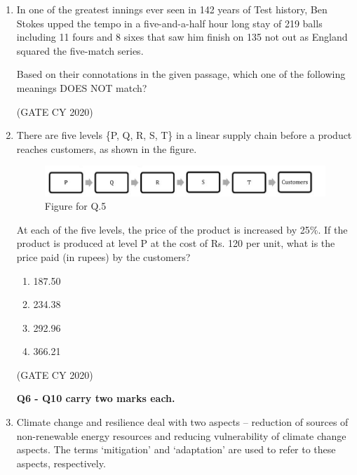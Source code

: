 \documentclass[12pt]{article}
\begin{document}
\begin{enumerate}
\item In one of the greatest innings ever seen in 142 years of Test history, Ben Stokes upped the tempo in a five-and-a-half hour long stay of 219 balls including 11 fours and 8 sixes that saw him finish on 135 not out as England squared the five-match series.

Based on their connotations in the given passage, which one of the following meanings DOES NOT match?
\begin{enumerate}
\end{enumerate}
\hfill (GATE CY 2020)

\item There are five levels \{P, Q, R, S, T\} in a linear supply chain before a product reaches customers, as shown in the figure.
\begin{figure}[H]
    \centering
    \includegraphics[width=0.4\columnwidth]{figs/q5.png}
    \caption{Figure for Q.5}
    \label{fig:q5}
\end{figure}
At each of the five levels, the price of the product is increased by 25\%. If the product is produced at level P at the cost of Rs. 120 per unit, what is the price paid (in rupees) by the customers?
\begin{multicols}{2}
\begin{enumerate}
\item 187.50
\item 234.38
\item 292.96
\item 366.21
\end{enumerate}
\end{multicols}
\hfill (GATE CY 2020)

\textbf{Q6 - Q10 carry two marks each.}


\item Climate change and resilience deal with two aspects – reduction of sources of non-renewable energy resources and reducing vulnerability of climate change aspects. The terms ‘mitigation’ and ‘adaptation’ are used to refer to these aspects, respectively.


\end{enumerate}
\end{document}
